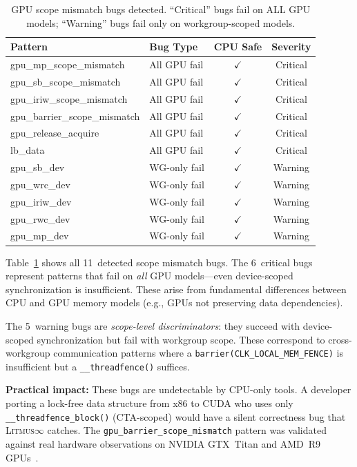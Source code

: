 \documentclass[10pt]{article}
\newcommand{\litmus}{\textsc{Litmus$\infty$}}
\newcommand{\cmark}{$\checkmark$}
\begin{document}
\begin{table}[h]
\centering
\caption{GPU scope mismatch bugs detected. ``Critical'' bugs fail on
ALL GPU models; ``Warning'' bugs fail only on workgroup-scoped models.}
\label{tab:gpu-scope}
\small
\begin{tabular}{llcc}
\toprule
\textbf{Pattern} & \textbf{Bug Type} & \textbf{CPU Safe} & \textbf{Severity} \\
\midrule
gpu\_mp\_scope\_mismatch & All GPU fail & \cmark & Critical \\
gpu\_sb\_scope\_mismatch & All GPU fail & \cmark & Critical \\
gpu\_iriw\_scope\_mismatch & All GPU fail & \cmark & Critical \\
gpu\_barrier\_scope\_mismatch & All GPU fail & \cmark & Critical \\
gpu\_release\_acquire & All GPU fail & \cmark & Critical \\
lb\_data & All GPU fail & \cmark & Critical \\
\midrule
gpu\_sb\_dev & WG-only fail & \cmark & Warning \\
gpu\_wrc\_dev & WG-only fail & \cmark & Warning \\
gpu\_iriw\_dev & WG-only fail & \cmark & Warning \\
gpu\_rwc\_dev & WG-only fail & \cmark & Warning \\
gpu\_mp\_dev & WG-only fail & \cmark & Warning \\
\bottomrule
\end{tabular}
\end{table}

Table~\ref{tab:gpu-scope} shows all 11~detected scope mismatch bugs.
The 6~critical bugs represent patterns that fail on \emph{all} GPU
models---even device-scoped synchronization is insufficient. These
arise from fundamental differences between CPU and GPU memory models
(e.g., GPUs not preserving data dependencies).

The 5~warning bugs are \emph{scope-level discriminators}: they succeed
with device-scoped synchronization but fail with workgroup scope.
These correspond to cross-workgroup communication patterns where a
\texttt{barrier(CLK\_LOCAL\_MEM\_FENCE)} is insufficient but a
\texttt{\_\_threadfence()} suffices.

\textbf{Practical impact:} These bugs are undetectable by CPU-only
tools. A developer porting a lock-free data structure from x86 to
CUDA who uses only \texttt{\_\_threadfence\_block()} (CTA-scoped)
would have a silent correctness bug that \litmus{} catches. The
\texttt{gpu\_barrier\_scope\_mismatch} pattern was validated against
real hardware observations on NVIDIA GTX~Titan and AMD~R9
GPUs~\cite{Sorensen2016}.
\end{document}
